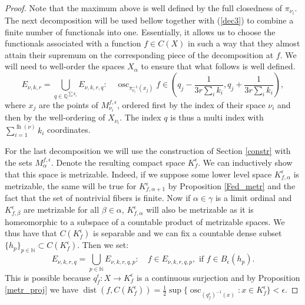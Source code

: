 \documentclass[11pt]{article}
\newcommand{\N}{\mathbb{N}}
\newcommand{\Q}{\mathbb{Q}}
\DeclareMathOperator{\osc}{osc}
\DeclareMathOperator{\dist}{dist}
\DeclareMathOperator{\lgth}{lh}
\theoremstyle{definition}
\theoremstyle{remark}
\begin{document}
\begin{proof}
	Note that the maximum above is well defined by the full closedness of $\pi_{\nu_i}$. The next decomposition will be used bellow together with (\ref{dec3}) to combine a finite number of functionals into one. Essentially, it allows us to choose the functionals associated with a function $f \in C(X)$ in such a way that they almost attain their supremum on the corresponding piece of the decomposition at $f$. We will need to well-order the spaces $X_\alpha$ to ensure that what follows is well defined.
	\begin{equation}\label{dec4}
		E_{\nu, k, r} = \bigcup_{q \in \Q^{\sum k_i}} E_{\nu, k, r, q}: \quad \osc_{\pi_{\nu_i}^{-1}(x_j)} f \in \left(q_j - \frac{1}{3 r \sum_i k_i}, q_j + \frac{1}{3 r \sum_i k_i}\right),
	\end{equation}
	where $x_j$ are the points of $M^{f, \epsilon}_{\nu_i}$, ordered first by the index of their space $\nu_i$ and then by the well-ordering of $X_{\nu_i}$. The index $q$ is thus a multi index with $\sum_{i = 1}^{\lgth(\nu)} k_i$ coordinates.
	
	For the last decomposition we will use the construction of Section \ref{constr} with the sets $M^{f,\epsilon}_\alpha$. Denote the resulting compact space $K_f^\epsilon$. We can inductively show that this space is metrizable. Indeed, if we suppose some lower level space $K_{f, \alpha}^\epsilon$ is metrizable, the same will be true for $K_{f, \alpha +1}^\epsilon$ by Proposition \ref{Fed_metr} and the fact that the set of nontrivial fibers is finite. Now if $\alpha \in \gamma$ is a limit ordinal and $K_{f, \beta}^\epsilon$ are metrizable for all $\beta \in \alpha$, $K_{f, \alpha}^\epsilon$ will also be metrizable as it is homeomorphic to a subspace of a countable product of metrizable spaces. We thus have that $C(K_f^\epsilon)$ is separable and we can fix a countable dense subset $\{h_p\}_{p \in \N} \subset C(K_f^\epsilon)$. Then we set:
	\begin{equation}\label{dec5}
		E_{\nu, k, r, q} = \bigcup_{p \in \N} E_{\nu, k, r, q, p}: \quad  f \in E_{\nu, k, r, q,p}, \text{ if } f \in B_{\epsilon}(h_p).
	\end{equation}
	This is possible because $q^\epsilon_f: X \to K^\epsilon_f$ is a continuous surjection and by Proposition \ref{metr_proj} we have $\dist(f, C(K^\epsilon_f)) = \frac{1}{2} \sup\{\osc_{(q^\epsilon_f)^{-1}(x)}: x \in K^\epsilon_f\} < \epsilon$.
	

\end{proof}
\end{document}
